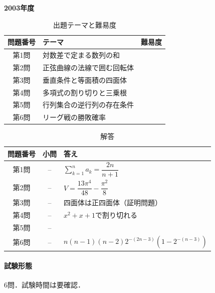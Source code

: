 \documentclass[../../main.tex]{subfiles}
\begin{document}
\begin{center}
  {\fontsize{48pt}{58pt}\selectfont \textbf{2003}\normalsize\textbf{年度}}
\end{center}

\begin{table}[htb]
  \centering
  \caption{出題テーマと難易度}
  \begin{tabular}{|c|p{9cm}|c|}
    \hline
    \textbf{問題番号} & \textbf{テーマ} & \textbf{難易度} \\
    \hline
    第1問 & 対数差で定まる数列の和 & \\
    \hline
    第2問 & 正弦曲線の法線で囲む回転体 & \\
    \hline
    第3問 & 垂直条件と等面積の四面体 & \\
    \hline
    第4問 & 多項式の割り切りと三乗根 & \\
    \hline
    第5問 & 行列集合の逆行列の存在条件 & \\
    \hline
    第6問 & リーグ戦の勝敗確率 & \\
    \hline
  \end{tabular}
\end{table}

\begin{table}[htb]
  \centering
  \caption{解答}
  \renewcommand{\arraystretch}{1.4}
  \begin{tabular}{|c|c|p{9cm}|}
    \hline
    \textbf{問題番号} & \textbf{小問} & \textbf{答え} \\
    \hline
    第1問 & -- & $\sum_{k=1}^n a_k=\dfrac{2n}{n+1}$ \\
    \hline
    第2問 & -- & $V=\dfrac{13\pi^4}{48}-\dfrac{\pi^2}{8}$ \\
    \hline
    第3問 & -- & 四面体は正四面体（証明問題） \\
    \hline
    第4問 & -- & $x^2+x+1$で割り切れる \\
    \hline
    第5問 & -- &  \\
    \hline
    第6問 & -- & $n(n-1)(n-2)2^{-(2n-3)}\left(1-2^{-(n-3)}\right)$ \\
    \hline
  \end{tabular}
\end{table}

\paragraph{試験形態}
6問．試験時間は要確認．
\end{document}
